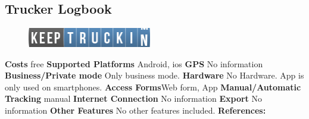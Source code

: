 \begin{singlespace}
\section{Trucker Logbook}
\begin{figure}
  \begin{center}
    \includegraphics[width=0.48\textwidth]{bilder/trucker}
  \end{center}
\end{figure}
\textbf{Costs} free
\newline\newline
\textbf{Supported Platforms} Android, \gls{ios}
\newline\newline
\textbf{GPS} No information
\newline\newline
\textbf{Business/Private mode} Only business mode.
\newline\newline
\textbf{Hardware} No Hardware. App is only used on smartphones.
\newline\newline
\textbf{Access Forms}Web form, App
\newline\newline
\textbf{Manual/Automatic Tracking} manual
\newline\newline
\textbf{Internet Connection} No information
\newline\newline
\textbf{Export} No information
\newline\newline
\textbf{Other Features} No other features included.
\newline\newline
\textbf{References:} \cite{Trucker_Logbook}
\newpage


\end{singlespace}
